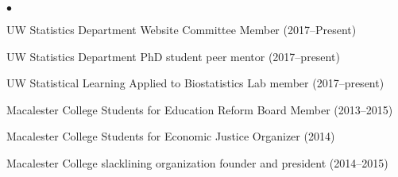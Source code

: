 \documentclass[margin,centered]{res}
\newenvironment{list1}{
  \begin{list}{\ding{113}}{%
      \setlength{\itemsep}{0in}
      \setlength{\parsep}{0in} \setlength{\parskip}{0in}
      \setlength{\topsep}{0in} \setlength{\partopsep}{0in}
      \setlength{\leftmargin}{0.17in}}}{\end{list}}
\newenvironment{list2}{
  \begin{list}{$\bullet$}{%
      \setlength{\itemsep}{0in}
      \setlength{\parsep}{0in} \setlength{\parskip}{0in}
      \setlength{\topsep}{0in} \setlength{\partopsep}{0in}
      \setlength{\leftmargin}{0.2in}}}{\end{list}}
\begin{document}
\begin{resume}
\begin{list1}
\item[]
\begin{list2}
\vspace*{.05in}
\item UW Statistics Department Website Committee Member (2017--Present)
\item UW Statistics Department PhD student peer mentor (2017--present)
\item UW Statistical Learning Applied to Biostatistics Lab member (2017--present)
\item Macalester College Students for Education Reform Board Member (2013--2015)
\item Macalester College Students for Economic Justice Organizer (2014)
\item Macalester College slacklining organization founder and president (2014--2015)
\end{list2}
\end{list1}




\begin{comment}
\section{\sc Extra-- \\ Cirriculars} 






{\bf Macalester College}, St. Paul, Minnesota
\begin{list1}
\item[]
\begin{list2}
\vspace*{.05in}
\item Board member of Macalester College Students for Education Reform
\item Organizer of Students for Economic Justice
\item Founder and president of Macalester College student slacklining organization
\end{list2}
\end{list1}
\end{comment}


\end{resume}
\end{document}
